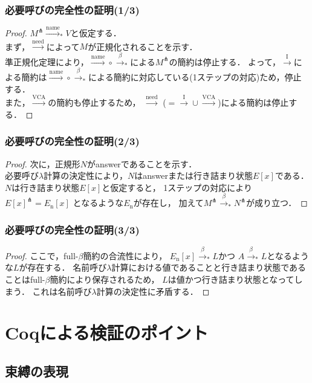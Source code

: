 \documentclass[dvipdfmx,cjk,xcolor=dvipsnames,envcountsect,notheorems,12pt]{beamer}
\theoremstyle{definition}
\newcommand{\EXPANDLET}[1]{#1^\pitchfork}
\newcommand{\FULLBETA}{\xrightarrow{\beta}}
\newcommand{\CALLBYNEED}{\xrightarrow{\mathrm{need}}}
\newcommand{\CALLBYNEEDI}{\xrightarrow{\mathrm{I}}}
\newcommand{\CALLBYNEEDVCA}{\xrightarrow{\mathrm{VCA}}}
\newcommand{\CALLBYNAME}{\xrightarrow{\mathrm{name}}}
\newcommand{\RTCLOS}[1]{#1_*}
\begin{document}
\begin{frame}
	\frametitle{必要呼びの完全性の証明(1/3)}
	\large
	\begin{proof}
		$\EXPANDLET{M}\RTCLOS{\CALLBYNAME}V$と仮定する．\\
		\smallskip
		まず，$\CALLBYNEED$によって$M$が正規化されることを示す．\\
		準正規化定理により，${\CALLBYNAME}\circ{\RTCLOS{\FULLBETA}}$による$\EXPANDLET{M}$の簡約は停止する．
		よって，$\CALLBYNEEDI$による簡約は${\CALLBYNAME}\circ{\RTCLOS{\FULLBETA}}$による簡約に対応している(1ステップの対応)ため，停止する．\\
		また，$\CALLBYNEEDVCA$の簡約も停止するため，
		$\CALLBYNEED$ ($= {\CALLBYNEEDI}\cup{\CALLBYNEEDVCA}$)による簡約は停止する．
		\phantom\qedhere
	\end{proof}
\end{frame}

\begin{frame}
	\frametitle{必要呼びの完全性の証明(2/3)}
	\large
	\begin{proof}
		次に，正規形$N$がanswerであることを示す．\\
		必要呼び$\lambda$計算の決定性により，$N$はanswerまたは行き詰まり状態$E[x]$である．\\
		$N$は行き詰まり状態$E[x]$と仮定すると，
		1ステップの対応により
		$\EXPANDLET{E[x]}=E_\mathrm{n}[x]$
		となるような$E_\mathrm{n}$が存在し，
		加えて$\EXPANDLET{M}\RTCLOS{\FULLBETA}\EXPANDLET{N}$が成り立つ．\phantom\qedhere
	\end{proof}
\end{frame}

\begin{frame}
	\frametitle{必要呼びの完全性の証明(3/3)}
	\large
	\begin{proof}
		ここで，full-$\beta$簡約の合流性により，
		$E_\mathrm{n}[x]\RTCLOS{\FULLBETA}L$かつ
		$A\RTCLOS{\FULLBETA}L$となるような$L$が存在する．
		名前呼び$\lambda$計算における値であることと行き詰まり状態であることはfull-$\beta$簡約により保存されるため，
		$L$は値かつ行き詰まり状態となってしまう．
		これは名前呼び$\lambda$計算の決定性に矛盾する．
	\end{proof}
\end{frame}

\section{Coqによる検証のポイント}

\subsection{束縛の表現}
\end{document}

